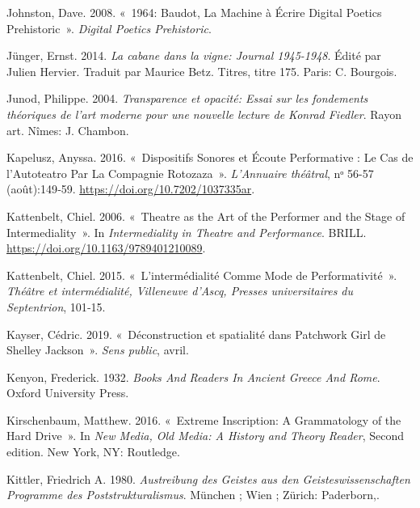 \begin{CSLReferences}{1}{0}
\leavevmode{}%
Johnston, Dave. 2008. {«~1964: {Baudot}, {La} Machine {à} {É}crire
{\textendash} {Digital Poetics Prehistoric}~»}. \emph{Digital Poetics
Prehistoric}.

\leavevmode{}%
Jünger, Ernst. 2014. \emph{{La cabane dans la vigne: Journal
1945-1948}}. Édité par Julien Hervier. Traduit par Maurice Betz.
{Titres}, titre 175. {Paris}: {C. Bourgois}.

\leavevmode{}%
Junod, Philippe. 2004. \emph{{Transparence et opacit{é}: Essai sur les
fondements th{é}oriques de l'art moderne pour une nouvelle lecture de
Konrad Fiedler}}. {Rayon art}. {N{î}mes}: {J. Chambon}.

\leavevmode{}%
Kapelusz, Anyssa. 2016. {«~Dispositifs Sonores et {É}coute Performative
: Le Cas de l'{Autoteatro} Par La Compagnie {Rotozaza}~»}.
\emph{L'Annuaire th{é}{â}tral}, nᵒ 56-57 (août):149‑59.
\url{https://doi.org/10.7202/1037335ar}.

\leavevmode{}%
Kattenbelt, Chiel. 2006. {«~Theatre as the {Art} of the {Performer} and
the {Stage} of {Intermediality}~»}. In \emph{Intermediality in {Theatre}
and {Performance}}. {BRILL}.
\url{https://doi.org/10.1163/9789401210089}.

\leavevmode{}%
Kattenbelt, Chiel. 2015. {«~L'interm{é}dialit{é} Comme Mode de
Performativit{é}~»}. \emph{Th{é}{â}tre et interm{é}dialit{é}, Villeneuve
d'Ascq, Presses universitaires du Septentrion}, 101‑15.

\leavevmode{}%
Kayser, Cédric. 2019. {«~{D{é}construction et spatialit{é} dans
Patchwork Girl de Shelley Jackson}~»}. \emph{Sens public}, avril.

\leavevmode{}%
Kenyon, Frederick. 1932. \emph{Books {And Readers In Ancient Greece And
Rome}}. {Oxford University Press}.

\leavevmode{}%
Kirschenbaum, Matthew. 2016. {«~Extreme {Inscription}: {A Grammatology}
of the {Hard Drive}~»}. In \emph{New {Media}, {Old Media}: {A History}
and {Theory Reader}}, Second edition. {New York, NY}: {Routledge}.

\leavevmode{}%
Kittler, Friedrich A. 1980. \emph{{Austreibung des Geistes aus den
Geisteswissenschaften Programme des Poststrukturalismus}}. {M{ü}nchen ;
Wien ; Z{ü}rich}: {Paderborn,}.


\end{CSLReferences}
